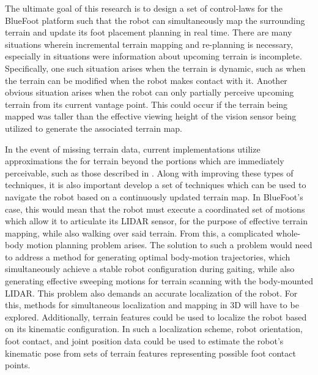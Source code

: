 	The ultimate goal of this research is to design a set of control-laws for the BlueFoot platform such that the robot can simultaneously map the surrounding terrain and update its foot placement planning in real time. There are many situations wherein incremental terrain mapping and re-planning is necessary, especially in situations were information about upcoming terrain is incomplete. Specifically, one such situation arises when the terrain is dynamic, such as when the terrain can be modified when the robot makes contact with it. Another obvious situation arises when the robot can only partially perceive upcoming terrain from its current vantage point. This could occur if the terrain being mapped was taller than the effective viewing height of the vision sensor being utilized to generate the associated terrain map.

	In the event of missing terrain data, current implementations utilize approximations the for terrain beyond the portions which are immediately perceivable, such as those described in \cite{Kolter2009}. Along with improving these types of techniques, it is also important develop a set of techniques which can be used to navigate the robot based on a continuously updated terrain map. In BlueFoot's case, this would mean that the robot must execute a coordinated set of motions which allow it to articulate its LIDAR sensor, for the purpose of effective terrain mapping, while also walking over said terrain. From this, a complicated whole-body motion planning problem arises. The solution to such a problem would need to address a method for generating optimal body-motion trajectories, which simultaneously achieve a stable robot configuration during gaiting, while also generating effective sweeping motions for terrain scanning with the body-mounted LIDAR. This problem also demands an accurate localization of the robot. For this, methods for simultaneous localization and mapping in 3D will have to be explored. Additionally, terrain features could be used to localize the robot based on its kinematic configuration. In such a localization scheme, robot orientation, foot contact, and joint position data could be used to estimate the robot's kinematic pose from sets of terrain features representing possible foot contact points.

